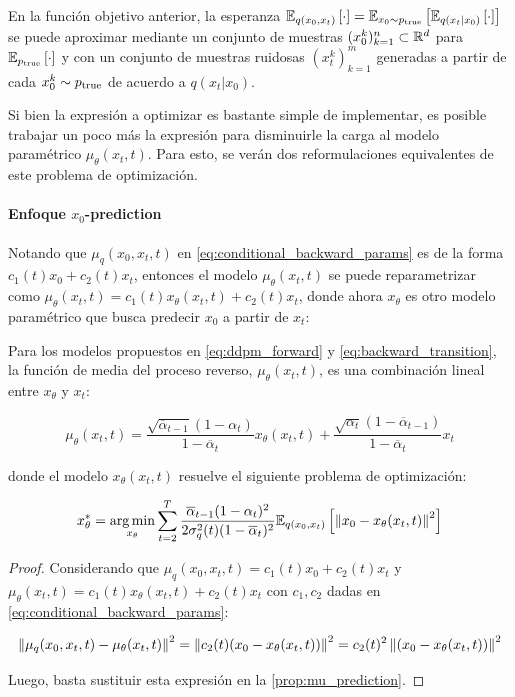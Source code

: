 En la función objetivo anterior, la esperanza $\mathbb{E}_{q(x_0,x_t)}\left[\cdot\right]=\mathbb{E}_{x_0\sim p_{\operatorname{true}}}\left[\mathbb{E}_{q(x_t|x_0)}\left[\cdot\right]\right]$ se puede aproximar mediante un conjunto de muestras $(x_0^k)_{k=1}^n\subset\mathbb{R}^d$ para $\mathbb{E}_{p_{\operatorname{true}}}\left[\cdot\right]$ y con un conjunto de muestras ruidosas $(x_t^k)_{k=1}^m$ generadas a partir de cada $x_0^k\sim p_{\operatorname{true}}$ de acuerdo a $q(x_t|x_0)$.

Si bien la expresión a optimizar es bastante simple de implementar, es posible trabajar un poco más la expresión para disminuirle la carga al modelo paramétrico $\mu_\theta(x_t,t)$. Para esto, se verán dos reformulaciones equivalentes de este problema de optimización.

\paragraph{Enfoque \texorpdfstring{$x_0$}{x0}-prediction}

Notando que $\mu_q(x_0,x_t,t)$ en \eqref{eq:conditional_backward_params} es de la forma $c_1(t)x_0 + c_2(t)x_t$, entonces el modelo $\mu_\theta(x_t,t)$ se puede reparametrizar como $\mu_\theta(x_t,t)=c_1(t)x_\theta(x_t,t) + c_2(t)x_t$, donde ahora $x_\theta$ es otro modelo paramétrico que busca predecir $x_0$ a partir de $x_t$:

\begin{prop}
    Para los modelos propuestos en \eqref{eq:ddpm_forward} y \eqref{eq:backward_transition}, la función de media del proceso reverso, $\mu_\theta(x_t,t)$, es una combinación lineal entre $x_\theta$ y $x_t$:

    \begin{equation*}
        \mu_\theta(x_t,t) = \frac{\sqrt{\overline{\alpha}_{t-1}}(1-\alpha_t)}{1-\overline{\alpha}_t}x_\theta(x_t,t) + \frac{\sqrt{\alpha_t}(1-\overline{\alpha}_{t-1})}{1-\overline{\alpha}_t}x_t
    \end{equation*}

    donde el modelo $x_\theta(x_t,t)$ resuelve el siguiente problema de optimización:

    \begin{equation*}
        x_\theta^* = \operatorname*{arg\,min}_{x_\theta} \sum_{t=2}^T \frac{\overline{\alpha}_{t-1}(1-\alpha_t)^2}{2\sigma_q^2(t)(1-\overline{\alpha}_t)^2} \mathbb{E}_{q(x_0,x_t)}\left[\left\lVert x_0-x_\theta(x_t,t) \right\rVert^2\right]
    \end{equation*}
\end{prop}

\begin{proof}
    Considerando que $\mu_q(x_0,x_t,t)=c_1(t)x_0 + c_2(t)x_t$ y $\mu_\theta(x_t,t)=c_1(t)x_\theta(x_t,t) + c_2(t)x_t$ con $c_1,c_2$ dadas en \eqref{eq:conditional_backward_params}:

    \begin{equation*}
        \left\lVert \mu_q(x_0,x_t,t)-\mu_\theta(x_t,t) \right\rVert^2 = \left\lVert c_2(t)(x_0-x_\theta(x_t,t)) \right\rVert^2 = c_2(t)^2 \left\lVert (x_0-x_\theta(x_t,t)) \right\rVert^2
    \end{equation*}

    Luego, basta sustituir esta expresión en la \autoref{prop:mu_prediction}.
\end{proof}

